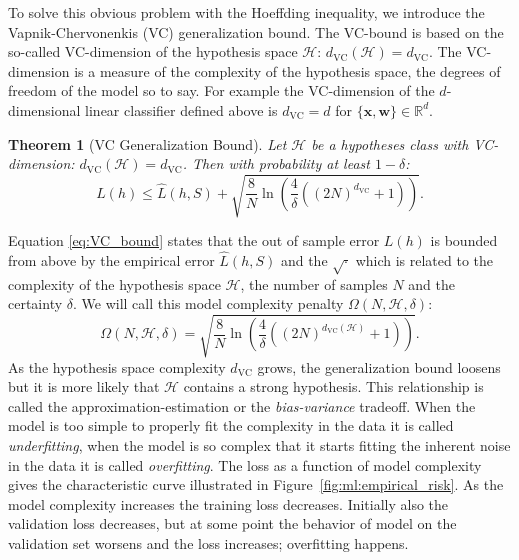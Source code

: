 \documentclass[a4paper, twoside, nobib]{tufte-book}
\newtheorem{theorem}{Theorem}
\renewcommand{\vec}[1]{\mathbf{#1}}
\begin{document}
To solve this obvious problem with the Hoeffding inequality, we introduce the Vapnik-Chervonenkis (VC) generalization bound. The VC-bound is based on the so-called VC-dimension of the hypothesis space $\mathcal{H}$: $d_\mathrm{VC}(\mathcal{H}) = d_\mathrm{VC}$. The VC-dimension is a measure of the complexity of the hypothesis space, the degrees of freedom of the model so to say. For example the VC-dimension of the $d$-dimensional linear classifier defined above is $d_\mathrm{VC}=d$ for $\{\vec{x}, \vec{w}\} \in \mathbb{R}^d$. 
\begin{theorem}[VC Generalization Bound]
  \label{theorem:hoeffding_finite}
  Let $\mathcal{H}$ be a hypotheses class with VC-dimension: $d_\mathrm{VC}(\mathcal{H}) = d_\mathrm{VC}$. Then with probability at least $1-\delta$: 
  \begin{equation}
    \label{eq:VC_bound}
    L(h) \leq \hat{L}(h, S) + \sqrt{ \frac{8}{N} \ln \left( \frac{4}{\delta} \left( \left(2N \right)^{d_\mathrm{VC}} + 1 \right)  \right)} .
  \end{equation}
\end{theorem}
Equation \eqref{eq:VC_bound} states that the out of sample error $L(h)$ is bounded from above by the empirical error $\hat{L}(h, S)$ and the $\sqrt{ \boldsymbol{\cdot}}$ which is related to the complexity of the hypothesis space $\mathcal{H}$, the number of samples $N$ and the certainty $\delta$. We will call this model complexity penalty $\Omega(N, \mathcal{H}, \delta)$:
\begin{equation}
  \Omega(N, \mathcal{H}, \delta) = \sqrt{ \frac{8}{N} \ln \left( \frac{4}{\delta} \left( \left(2N \right)^{d_\mathrm{VC}(\mathcal{H})} + 1 \right)  \right)}.
\end{equation}
As the hypothesis space complexity $d_\mathrm{VC}$ grows, the generalization bound loosens but it is more likely that $\mathcal{H}$ contains a strong hypothesis. This relationship is called the approximation-estimation or the  \emph{bias-variance} tradeoff. When the model is too simple to properly fit the complexity in the data it is called \emph{underfitting}, when the model is so complex that it starts fitting the inherent noise in the data it is called \emph{overfitting}. The loss as a function of model complexity gives the characteristic curve illustrated in Figure~\ref{fig:ml:empirical_risk}. As the model complexity increases the training loss decreases. Initially also the validation loss decreases, but at some point the behavior of model on the validation set worsens and the loss increases; overfitting happens. 
\end{document}
